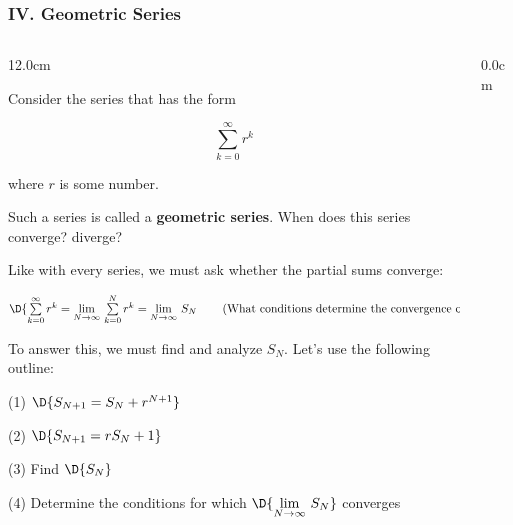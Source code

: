 \begin{frame}
\frametitle{IV. Geometric Series}
\scriptsize
\begin{columns}
\begin{column}{12.0cm}

Consider the series that has the form 

$$
\sum \limits_{k = 0}^{\infty} r^k
$$

where $r$ is some number. 

\vspace{0.4cm}

Such a series is called a {\bf geometric series}.  When does this series converge? diverge?

\vspace{0.4cm}

Like with every series, we must ask whether the partial sums converge:

\begin{center}
	$\D{
	\sum \limits_{k = 0}^{\infty} r^k = \lim \limits_{N \to \infty}\, \sum \limits_{k = 0}^{N} r^k = \lim \limits_{N \to \infty}\, S_N \qquad \left(\text{What conditions determine the convergence of} \, \{S_N\}? \right)
	}$
\end{center}

To answer this, we must find and analyze $S_N$.  Let's use the following outline:

\vspace{0.3cm}

\hspace{0.8cm} (1) $\D{S_{N+1} = S_N + r^{N+1}}$

\vspace{0.2cm}

\hspace{0.8cm} (2) $\D{S_{N+1} = rS_N + 1}$

\vspace{0.2cm}

\hspace{0.8cm} (3) Find $\D{S_{N}}$

\vspace{0.2cm}

\hspace{0.8cm} (4) Determine the conditions for which $\D{\lim \limits_{N \to \infty}\, S_{N} }$ converges

\end{column}
\begin{column}{0.0cm}\end{column}
\end{columns}
\end{frame}

